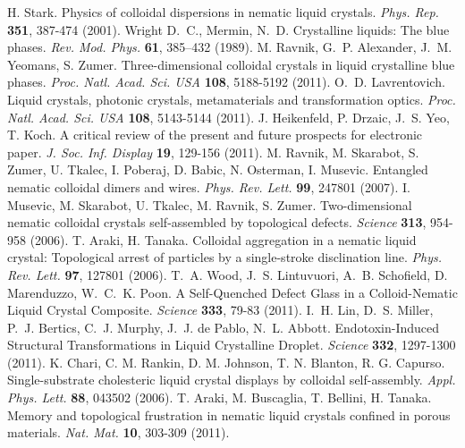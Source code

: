 \documentclass[12pt]{article}
\begin{document}
\begin{thebibliography}{99}
 H. Stark. Physics of
colloidal dispersions in nematic liquid crystals. 
{\it Phys. Rep.} {\bf 351}, 387-474 (2001).
 Wright D.~C., Mermin, N.~D. Crystalline liquids: The blue phases. {\it Rev. Mod. Phys.} {\bf 61}, 385–432 (1989).
 M. Ravnik, G.~P. Alexander, J.~M. Yeomans,  
S. Zumer.  Three-dimensional colloidal crystals in liquid crystalline 
blue phases. {\it Proc. Natl. Acad. Sci. USA} {\bf 108}, 5188-5192 (2011).
 O.~D. Lavrentovich.
 Liquid crystals, photonic crystals, metamaterials and transformation optics. 
{\it Proc. Natl. Acad. Sci. USA} {\bf 108}, 5143-5144 (2011).
 J. Heikenfeld, P. Drzaic,  J.~S. Yeo, T. Koch.
A critical review of the present and future prospects for electronic paper.
{\it J. Soc. Inf. Display} {\bf 19}, 129-156 (2011).
 M. Ravnik, M. Skarabot, S. Zumer, U. Tkalec, I. Poberaj, D. Babic, N. Osterman, I. Musevic.  Entangled nematic colloidal dimers and wires. 
{\it Phys. Rev. Lett.} {\bf 99}, 247801 (2007).
 I. Musevic, M. Skarabot, U. Tkalec, M. Ravnik,
S. Zumer. Two-dimensional nematic colloidal crystals self-assembled by topological defects. {\it Science} {\bf 313}, 954-958 (2006).
 T. Araki, H. Tanaka.  Colloidal aggregation in a nematic liquid crystal: Topological arrest of particles by a single-stroke disclination line. {\it Phys. Rev. Lett.} {\bf 97}, 127801 (2006).
 T.~A. Wood, J.~S. Lintuvuori, A.~B. Schofield, D. Marenduzzo,
W.~C.~K. Poon. A Self-Quenched Defect Glass in a Colloid-Nematic Liquid Crystal Composite. {\it Science} {\bf 333}, 79-83 (2011).
 I.~H. Lin, D.~S. Miller, P.~J. Bertics, C.~J. Murphy, J.~J. de Pablo, N.~L. Abbott. Endotoxin-Induced Structural Transformations in Liquid Crystalline Droplet. {\it Science} {\bf 332}, 1297-1300 (2011).
 K. Chari, C. M. Rankin, D. M. Johnson, T. N. Blanton,
R. G. Capurso. Single-substrate cholesteric liquid crystal displays by colloidal self-assembly. {\it Appl. Phys. Lett.} {\bf 88}, 043502 (2006).
 T. Araki, M. Buscaglia, T. Bellini, H. Tanaka.
Memory and topological frustration in nematic liquid crystals confined in porous materials. {\it Nat. Mat.} {\bf 10}, 303-309 (2011).

\end{thebibliography}
\end{document}
